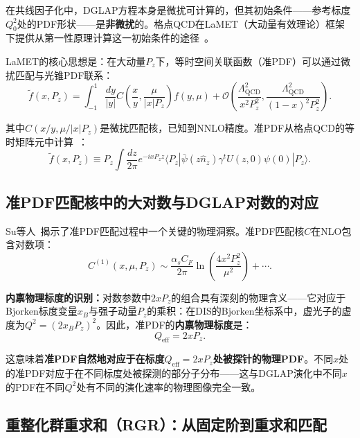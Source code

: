 \documentclass[12pt,a4paper]{ctexart}
\theoremstyle{definition}
\begin{document}
在共线因子化中，DGLAP方程本身是微扰可计算的，但其初始条件——参考标度$Q_0^2$处的PDF形状——是\textbf{非微扰}的。格点QCD在LaMET（大动量有效理论）框架下提供从第一性原理计算这一初始条件的途径~\cite{Ji2013Euclidean,Ji2014LaMET}。

LaMET的核心思想是：在大动量$P_z$下，等时空间关联函数（准PDF）可以通过微扰匹配与光锥PDF联系：
\begin{equation}
\tilde f(x, P_z) = \int_{-1}^1 \frac{dy}{|y|} C\!\left(\frac{x}{y}, \frac{\mu}{|x|P_z}\right) f(y, \mu) + \mathcal{O}\!\left(\frac{\Lambda_{\text{QCD}}^2}{x^2 P_z^2}, \frac{\Lambda_{\text{QCD}}^2}{(1-x)^2 P_z^2}\right).
\label{eq:LaMET_factorization}
\end{equation}

其中$C(x/y, \mu/|x|P_z)$是微扰匹配核，已知到NNLO精度。准PDF从格点QCD的等时矩阵元中计算~\cite{Ji2013Euclidean}：
\begin{equation}
\tilde f(x, P_z) \equiv P_z \int \frac{dz}{2\pi} e^{-i x P_z z} \langle P_z | \bar\psi(z\hat n_z) \gamma^t U(z, 0) \psi(0) | P_z \rangle.
\label{eq:quasi_PDF_lattice}
\end{equation}

\subsection{准PDF匹配核中的大对数与DGLAP对数的对应}

Su等人~\cite{Su2023RGR}揭示了准PDF匹配过程中一个关键的物理洞察。准PDF匹配核$C$在NLO包含对数项：
\begin{equation}
C^{(1)}(x, \mu, P_z) \sim \frac{\alpha_s C_F}{2\pi} \ln\!\left(\frac{4x^2 P_z^2}{\mu^2}\right) + \cdots.
\label{eq:matching_log}
\end{equation}

\textbf{内禀物理标度的识别：}对数参数中$2xP_z$的组合具有深刻的物理含义——它对应于Bjorken标度变量$x_B$与强子动量$P_z$的乘积：在DIS的Bjorken坐标系中，虚光子的虚度为$Q^2 = (2x_B P_z)^2$。因此，准PDF的\textbf{内禀物理标度}是：
\begin{equation}
\boxed{Q_{\text{eff}} = 2xP_z}.
\label{eq:intrinsic_scale}
\end{equation}

这意味着\textbf{准PDF自然地对应于在标度$Q_{\text{eff}} = 2xP_z$处被探针的物理PDF}。不同$x$处的准PDF对应于在不同标度处被探测的部分子分布——这与DGLAP演化中不同$x$的PDF在不同$Q^2$处有不同的演化速率的物理图像完全一致。

\subsection{重整化群重求和（RGR）：从固定阶到重求和匹配}
\end{document}
